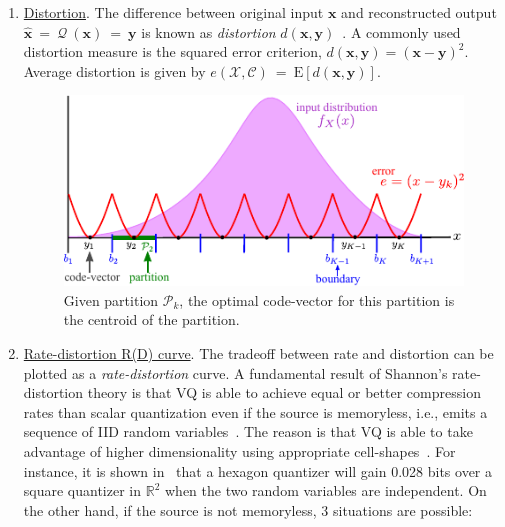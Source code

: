\begin{enumerate}
\item \underline{Distortion}.  The difference between original input $\mathbf{x}$ and reconstructed output $\hat{\mathbf{x}}~=~\mathcal{Q}~(\mathbf{x})~=~\mathbf{y}$ is known as \emph{distortion} $d(\mathbf{x}, \mathbf{y})$~\cite{2005_BOOK_DataCompression_Sayood}.  A commonly used distortion measure is the squared error criterion, $d(\mathbf{x}, \mathbf{y})=(\mathbf{x}-\mathbf{y})^2$.  Average distortion is given by $e(\mathcal{X}, \mathcal{C})~=~\mathrm{E}\left[d(\mathbf{x}, \mathbf{y}) \right]$.  



								\begin{figure}[t]			
								\includegraphics[width=1\textwidth]{thesis/quantization_scalar.pdf}
								\caption{Given partition $\mathcal{P}_k$, the optimal code-vector for this partition is the centroid of the partition.}
								\label{fig:quantization_scalar}	
								\end{figure}

\item \underline{Rate-distortion R(D) curve}.  The tradeoff between rate and distortion can be plotted as a \emph{rate-distortion} curve.  A fundamental result of Shannon's rate-distortion theory is that VQ is able to achieve equal or better compression rates than scalar quantization even if the source is memoryless, i.e., emits a sequence of IID random variables~\cite{1984_JNL_VQ_Gray}.   The reason is that VQ is able to take advantage of higher dimensionality using appropriate cell-shapes~\cite{1985_JNL_VQ_Makhoul}.  For instance, it is shown in~\cite{1985_JNL_VQ_Makhoul} that a hexagon quantizer will gain 0.028 bits over a square quantizer in $\mathbb{R}^2$ when the two random variables are independent.  On the other hand, if the source is not memoryless, 3 situations are possible:


\end{enumerate}
